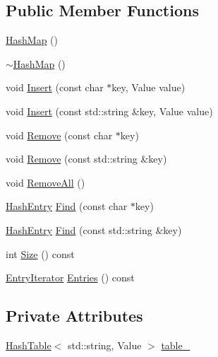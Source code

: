 \subsection*{Public Member Functions}
\begin{DoxyCompactItemize}
\item 
\hyperlink{classmocha_1_1_hash_map_3_01const_01char_01_5_00_01_value_01_4_acfdc9c05b738f14b2999c8b87f6ba36e}{HashMap} ()
\item 
\hyperlink{classmocha_1_1_hash_map_3_01const_01char_01_5_00_01_value_01_4_a7173dc62e2ab8dee6783862ddfbf2469}{$\sim$HashMap} ()
\item 
void \hyperlink{classmocha_1_1_hash_map_3_01const_01char_01_5_00_01_value_01_4_ae939aa36c41bf73ee865a1b1fb51b026}{Insert} (const char $\ast$key, Value value)
\item 
void \hyperlink{classmocha_1_1_hash_map_3_01const_01char_01_5_00_01_value_01_4_a0a616301a9867e1d2a176f9cf4f6f05c}{Insert} (const std::string \&key, Value value)
\item 
void \hyperlink{classmocha_1_1_hash_map_3_01const_01char_01_5_00_01_value_01_4_af8bf2243591e85ba9ec1107eab9a1dd7}{Remove} (const char $\ast$key)
\item 
void \hyperlink{classmocha_1_1_hash_map_3_01const_01char_01_5_00_01_value_01_4_aacc86757d4f0f3b3ae9b189c2d443585}{Remove} (const std::string \&key)
\item 
void \hyperlink{classmocha_1_1_hash_map_3_01const_01char_01_5_00_01_value_01_4_a3bfc0c983e947b7d22293e630c8d0460}{RemoveAll} ()
\item 
\hyperlink{classmocha_1_1_entry}{HashEntry} \hyperlink{classmocha_1_1_hash_map_3_01const_01char_01_5_00_01_value_01_4_a3a1083d019461a1b11497701645df76b}{Find} (const char $\ast$key)
\item 
\hyperlink{classmocha_1_1_entry}{HashEntry} \hyperlink{classmocha_1_1_hash_map_3_01const_01char_01_5_00_01_value_01_4_a83d0b14bbfa209964e59cf52c29643bc}{Find} (const std::string \&key)
\item 
int \hyperlink{classmocha_1_1_hash_map_3_01const_01char_01_5_00_01_value_01_4_a4fd09dd0e69b51f55e7ceea5a1190d6f}{Size} () const 
\item 
\hyperlink{classmocha_1_1_entry_iterator_base}{EntryIterator} \hyperlink{classmocha_1_1_hash_map_3_01const_01char_01_5_00_01_value_01_4_ace303af0008e1302ce8aac1ede89624c}{Entries} () const 
\end{DoxyCompactItemize}
\subsection*{Private Attributes}
\begin{DoxyCompactItemize}
\item 
\hyperlink{classmocha_1_1_hash_table}{HashTable}$<$ std::string, Value $>$ \hyperlink{classmocha_1_1_hash_map_3_01const_01char_01_5_00_01_value_01_4_a8d8a5d3b64971ad73706c746afffccf0}{table\_\-}
\end{DoxyCompactItemize}


